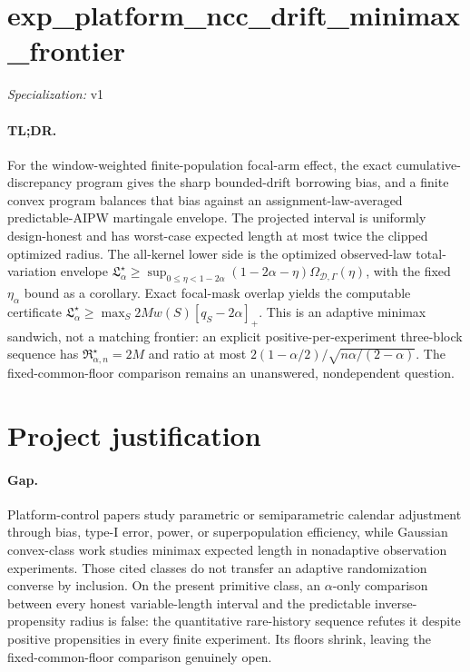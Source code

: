 \documentclass{article}
\begin{document}
\sloppy

\section*{exp\_\allowbreak{}platform\_\allowbreak{}ncc\_\allowbreak{}drift\_\allowbreak{}minimax\_\allowbreak{}frontier}

\noindent\textit{Specialization:} v1\par

\paragraph{TL;DR.} For the window-weighted finite-population focal-arm effect, the exact cumulative-discrepancy program gives the sharp bounded-drift borrowing bias, and a finite convex program balances that bias against an assignment-law-averaged predictable-AIPW martingale envelope. The projected interval is uniformly design-honest and has worst-case expected length at most twice the clipped optimized radius. The all-kernel lower side is the optimized observed-law total-variation envelope \(\mathfrak L_\alpha^\star\ge\sup_{0\le\eta<1-2\alpha}(1-2\alpha-\eta)\Omega_{\mathcal D,\Gamma}(\eta)\), with the fixed \(\eta_\alpha\) bound as a corollary. Exact focal-mask overlap yields the computable certificate \(\mathfrak L_\alpha^\star\ge\max_S2Mw(S)[q_S-2\alpha]_+\). This is an adaptive minimax sandwich, not a matching frontier: an explicit positive-per-experiment three-block sequence has \(\mathfrak R_{\alpha,n}^\star=2M\) and ratio at most \(2(1-\alpha/2)/\sqrt{n\alpha/(2-\alpha)}\). The fixed-common-floor comparison remains an unanswered, nondependent question.

\section{Project justification}

\paragraph{Gap.} Platform-control papers study parametric or semiparametric calendar adjustment through bias, type-I error, power, or superpopulation efficiency, while Gaussian convex-class work studies minimax expected length in nonadaptive observation experiments. Those cited classes do not transfer an adaptive randomization converse by inclusion. On the present primitive class, an \(\alpha\)-only comparison between every honest variable-length interval and the predictable inverse-propensity radius is false: the quantitative rare-history sequence refutes it despite positive propensities in every finite experiment. Its floors shrink, leaving the fixed-common-floor comparison genuinely open.
\end{document}

